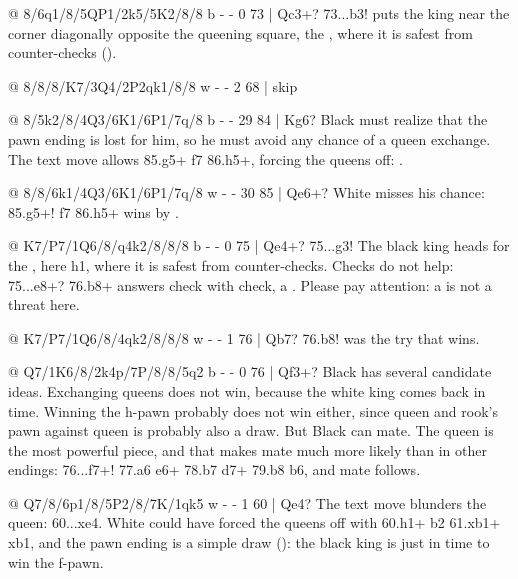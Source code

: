 
@ 8/6q1/8/5QP1/2k5/5K2/8/8 b - - 0 73 | Qc3+?
73...\K b3! puts the king near the corner diagonally opposite the queening square, the
, where it is safest from counter-checks
().

@ 8/8/8/K7/3Q4/2P2qk1/8/8 w - - 2 68 | skip

@ 8/5k2/8/4Q3/6K1/6P1/7q/8 b - - 29 84 | Kg6?
Black must realize that the pawn ending is lost for him, so he must avoid any chance of a queen
exchange. The text move allows 85.\Q g5+ \K f7 86.\Q h5+, forcing the queens off:
.

@ 8/8/6k1/4Q3/6K1/6P1/7q/8 w - - 30 85 | Qe6+?
White misses his chance: 85.\Q g5+! \K f7 86.\Q h5+ wins by .

@ K7/P7/1Q6/8/q4k2/8/8/8 b - - 0 75 | Qe4+?
75...\K g3! The black king heads for the , here h1,
where it is safest from counter-checks. Checks do not help:
75...\Q e8+? 76.\Q b8+ answers check with check, a
. Please pay
attention: a  is not a threat here.

@ K7/P7/1Q6/8/4qk2/8/8/8 w - - 1 76 | Qb7?
76.\K b8! was the try that wins.

@ Q7/1K6/8/2k4p/7P/8/8/5q2 b - - 0 76 | Qf3+?
Black has several candidate ideas. Exchanging queens does not win, because the white king comes
back in time. Winning the h-pawn probably does not win either, since queen and rook's pawn against
queen is probably also a draw. But Black can mate. The queen is the most powerful piece, and that
makes mate much more likely than in other endings: 76...\Q f7+! 77.\K a6 \Q e6+ 78.\K b7
\Q d7+ 79.\K b8 \K b6, and mate follows.

@ Q7/8/6p1/8/5P2/8/7K/1qk5 w - - 1 60 | Qe4?
The text move blunders the queen: 60...\Q xe4. White could have forced the queens off with
60.\Q h1+ \K b2 61.\Q xb1+ \K xb1, and the pawn ending is a simple draw (): the black king is just in
time to win the f-pawn.

